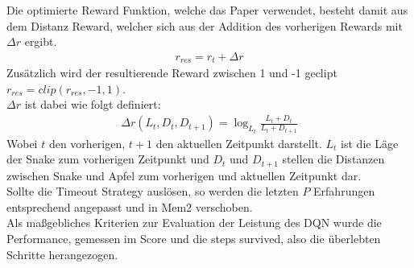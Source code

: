 Die optimierte Reward Funktion, welche das Paper verwendet, besteht damit aus dem Distanz Reward, welcher sich aus der Addition des vorherigen Rewards mit $\Delta r$ ergibt.
\begin{align}
	r_{res} = r_t + \Delta r
\end{align}
Zusätzlich wird der resultierende Reward zwischen 1 und -1 geclipt $r_{res} = clip(r_{res}, -1, 1)$.\\
$\Delta r$ ist dabei wie folgt definiert:
\begin{align}
	\Delta r(L_t, D_t,D_{t+1}) = \log_{L_t}\frac{L_t + D_t}{L_t + D_{t + 1}}
\end{align}
Wobei $t$ den vorherigen, $t+1$ den aktuellen Zeitpunkt darstellt. $L_t$ ist die Läge der Snake zum vorherigen Zeitpunkt und $D_t$ und $D_{t+1}$ stellen die Distanzen zwischen Snake und Apfel zum vorherigen und aktuellen Zeitpunkt dar.\\
Sollte die Timeout Strategy auslösen, so werden die letzten $P$ Erfahrungen entsprechend angepasst und in Mem2 verschoben.\\
Als maßgebliches Kriterien zur Evaluation der Leistung des DQN wurde die Performance, gemessen im Score und die steps survived, also die überlebten Schritte herangezogen.


